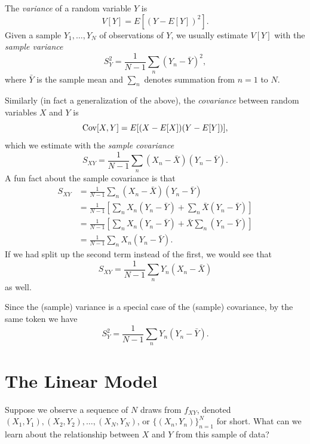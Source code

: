 \documentclass[
  12pt,
  oneside,openany]{book}
\begin{document}
The \emph{variance} of a random variable \(Y\) is
\begin{equation}
V[Y] = E[(Y - E[Y])^2].
\end{equation}
Given a sample \(Y_1, \ldots, Y_N\) of observations of \(Y\), we usually estimate \(V[Y]\) with the \emph{sample variance}
\begin{equation}
S_Y^2 = \frac{1}{N-1} \sum_n (Y_n - \bar{Y})^2,
\end{equation}
where \(\bar{Y}\) is the sample mean and \(\sum_n\) denotes summation from \(n = 1\) to \(N\).

Similarly (in fact a generalization of the above), the \emph{covariance} between random variables \(X\) and \(Y\) is
\[
\mathop{\rm Cov}\nolimits[X, Y] = E[(X - E[X]) (Y - E[Y])],
\]
which we estimate with the \emph{sample covariance}
\begin{equation}
S_{XY} = \frac{1}{N-1} \sum_n (X_n - \bar{X}) (Y_n - \bar{Y}).
\end{equation}
A fun fact about the sample covariance is that
\begin{align}
S_{XY}
&= \frac{1}{N-1} \sum_n (X_n - \bar{X}) (Y_n - \bar{Y}) \\
&= \frac{1}{N-1} \left[ \sum_n X_n (Y_n - \bar{Y}) + \sum_n \bar{X} (Y_n - \bar{Y}) \right] \\
&= \frac{1}{N-1} \left[ \sum_n X_n (Y_n - \bar{Y}) + \bar{X} \sum_n (Y_n - \bar{Y}) \right] \\
&= \frac{1}{N-1} \sum_n X_n (Y_n - \bar{Y}).
\end{align}
If we had split up the second term instead of the first, we would see that
\[
S_{XY} = \frac{1}{N-1} \sum_n Y_n (X_n - \bar{X})
\]
as well.

Since the (sample) variance is a special case of the (sample) covariance, by the same token we have
\begin{equation}
S_Y^2 = \frac{1}{N-1} \sum_n Y_n (Y_n - \bar{Y}).
\end{equation}

\hypertarget{the-linear-model}{%
\section{The Linear Model}\label{the-linear-model}}

Suppose we observe a sequence of \(N\) draws from \(f_{XY}\), denoted \((X_1, Y_1), (X_2, Y_2), \ldots, (X_N, Y_N)\), or \(\{(X_n, Y_n)\}_{n=1}^N\) for short. What can we learn about the relationship between \(X\) and \(Y\) from this sample of data?
\end{document}

